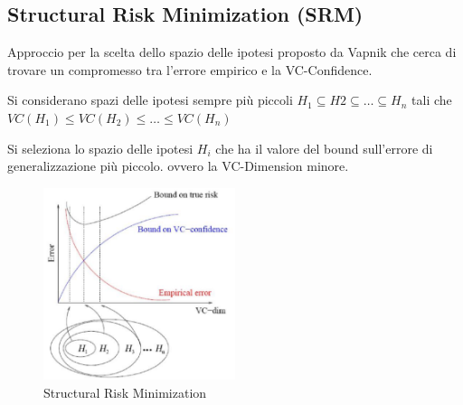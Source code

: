 \subsection{Structural Risk Minimization (SRM)}\label{sec:srm}

Approccio per la scelta dello spazio delle ipotesi proposto da Vapnik
che cerca di trovare un compromesso tra l'errore empirico e la
VC-Confidence.

Si considerano spazi delle ipotesi sempre più piccoli $H_1 \subseteq H2 \subseteq \ldots \subseteq H_n$ tali che $ VC(H_1) \leq VC(H_2) \leq \ldots \leq VC(H_n)$

Si seleziona lo spazio delle ipotesi $H_i$ che ha il valore del bound
sull'errore di generalizzazione più piccolo. ovvero la VC-Dimension minore.

\begin{figure}[htbp]
\centering
\includegraphics[width=0.5\textwidth]{./notes/immagini/l5-srm.png}
\caption{Structural Risk Minimization}
\end{figure}
